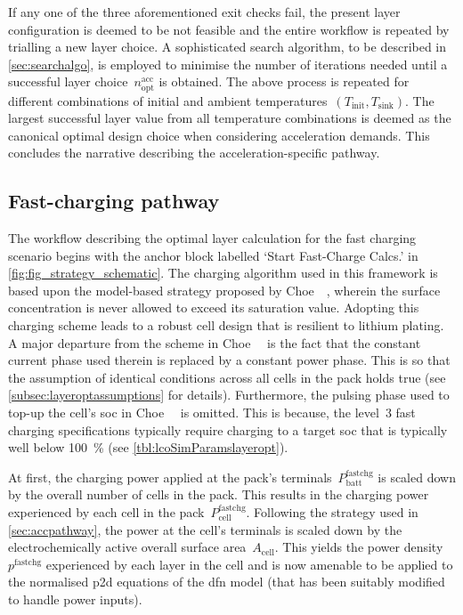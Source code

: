 If  any one  of the  three aforementioned  exit checks  fail, the  present layer
configuration is deemed  to be not feasible and the  entire workflow is repeated
by  trialling a  new  layer  choice. A  sophisticated  search  algorithm, to  be
described  in  \cref{sec:searchalgo}, is  employed  to  minimise the  number  of
iterations  needed  until  a successful  layer  choice~$n_\text{opt}^\text{acc}$
is  obtained.  The above  process  is  repeated  for different  combinations  of
initial and ambient temperatures~${(T_\text{init}, T_\text{sink})}$. The largest
successful  layer value  from  all  temperature combinations  is  deemed as  the
canonical  optimal design  choice  when considering  acceleration demands.  This
concludes the narrative describing the acceleration-specific pathway.


\subsection{Fast-charging pathway}\label{sec:fastchgpathway}

The  workflow describing  the optimal  layer calculation  for the  fast charging
scenario begins  with the  anchor block labelled  `Start Fast-Charge  Calcs.' in
\cref{fig:fig_strategy_schematic}. The charging algorithm used in this framework
is based  upon the model-based strategy  proposed by Choe~\etal~\cite{Choe2013},
wherein  the surface  concentration is  never allowed  to exceed  its saturation
value.  Adopting  this charging  scheme  leads  to  a  robust cell  design  that
is  resilient  to  lithium  plating.  A  major  departure  from  the  scheme  in
Choe~\etal~\cite{Choe2013}  is the  fact that  the constant  current phase  used
therein is replaced  by a constant power  phase. This is so  that the assumption
of  identical  conditions  across  all  cells   in  the  pack  holds  true  (see
\cref{subsec:layeroptassumptions} for  details). Furthermore, the  pulsing phase
used to  top-up the cell's  \gls{soc} in Choe~\etal~\cite{Choe2013}  is omitted.
This  is because,  the level~3  fast charging  specifications typically  require
charging to a  target \gls{soc} that is typically  well below \SI{100}{\percent}
(see \cref{tbl:lcoSimParamslayeropt}).

At     first,     the    charging     power     applied     at    the     pack's
terminals~$P_\text{batt}^\text{fastchg}$ is scaled down by the overall number of
cells in the pack.  This results in the charging power  experienced by each cell
in  the  pack~$P_\text{cell}^\text{fastchg}$.  Following the  strategy  used  in
\cref{sec:accpathway}, the power  at the cell's terminals is scaled  down by the
electrochemically active  overall surface area~$A_\text{cell}$. This  yields the
power density~$p^{\text{fastchg}}$ experienced by each  layer in the cell and is
now  amenable  to be  applied  to  the  normalised  \gls{p2d} equations  of  the
\gls{dfn} model (that has been suitably modified to handle power inputs).

